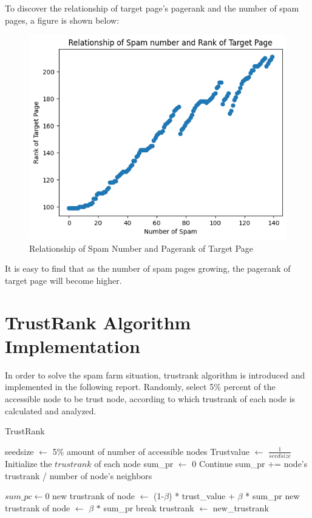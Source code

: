 \documentclass{article}
\begin{document}
	To discover the relationship of target page's pagerank and the number of spam pages, a figure is shown below:
	\begin{figure}[H]
		\centering
		\includegraphics[scale=0.5]{Relationship of Spam Number and Pagerank of Target Page.png}
		\caption{Relationship of Spam Number and Pagerank of Target Page}
	\end{figure}
	It is easy to find that as the number of spam pages growing, the pagerank of target page will become higher.
	
	\section*{TrustRank Algorithm Implementation}
	In order to solve the spam farm situation, trustrank algorithm is introduced and implemented in the following report. Randomly, select 5\% percent of the accessible node to be trust node, according to which trustrank of each node is calculated and analyzed.
	
	\begin{algorithm}
		\caption{TrustRank}\label{alg:trustrank}
		\begin{algorithmic}
			\State seedsize $\gets$ 5\% amount of number of accessible nodes
			\State Trustvalue $\gets$ $\frac{1}{seedsize}$
			\State Initialize the $trustrank$ of each node 
			\State sum\_pr $\gets$ 0 
			\State Continue
			\EndIf
			\State sum\_pr += node's trustrank / number of node's neighbors
			
			\EndFor
			\Else
			\State $sum\_pc \gets 0$
			\EndIf
				\State new trustrank of node $\gets$ (1-$\beta$) * trust\_value + $\beta$ * sum\_pr
			\Else
				\State new trustrank of node $\gets$ $\beta$ $*$ sum\_pr
			\EndIf
			\EndFor
			\State break
			\EndIf
			\State trustrank $\gets$ new\_trustrank
			\EndFor
		\end{algorithmic}
	\end{algorithm}
	
\end{document}
